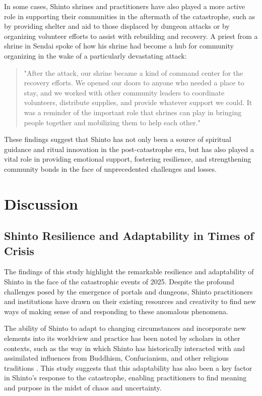 \documentclass[12pt, a4paper]{article}
\begin{document}
In some cases, Shinto shrines and practitioners have also played a more active role in supporting their communities in the aftermath of the catastrophe, such as by providing shelter and aid to those displaced by dungeon attacks or by organizing volunteer efforts to assist with rebuilding and recovery. A priest from a shrine in Sendai spoke of how his shrine had become a hub for community organizing in the wake of a particularly devastating attack:

\begin{quote}
"After the attack, our shrine became a kind of command center for the recovery efforts. We opened our doors to anyone who needed a place to stay, and we worked with other community leaders to coordinate volunteers, distribute supplies, and provide whatever support we could. It was a reminder of the important role that shrines can play in bringing people together and mobilizing them to help each other."
\end{quote}

These findings suggest that Shinto has not only been a source of spiritual guidance and ritual innovation in the post-catastrophe era, but has also played a vital role in providing emotional support, fostering resilience, and strengthening community bonds in the face of unprecedented challenges and losses.

\section{Discussion}
\subsection{Shinto Resilience and Adaptability in Times of Crisis}
The findings of this study highlight the remarkable resilience and adaptability of Shinto in the face of the catastrophic events of 2025. Despite the profound challenges posed by the emergence of portals and dungeons, Shinto practitioners and institutions have drawn on their existing resources and creativity to find new ways of making sense of and responding to these anomalous phenomena.

The ability of Shinto to adapt to changing circumstances and incorporate new elements into its worldview and practice has been noted by scholars in other contexts, such as the way in which Shinto has historically interacted with and assimilated influences from Buddhism, Confucianism, and other religious traditions \citep{hardacre2017, rots2017}. This study suggests that this adaptability has also been a key factor in Shinto's response to the catastrophe, enabling practitioners to find meaning and purpose in the midst of chaos and uncertainty.
\end{document}
